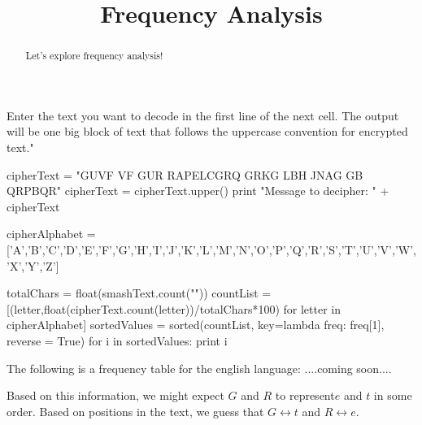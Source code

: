 \documentclass[handout]{ximera}
\title{Frequency Analysis}
\begin{document}
\begin{abstract}{Let's explore frequency analysis!}\end{abstract}


Enter the text you want to decode in the first line of the next cell.  The output will be one big block of text that follows the uppercase convention for encrypted text."

\begin{python}
cipherText = "GUVF VF GUR RAPELCGRQ GRKG LBH JNAG GB QRPBQR"
cipherText = cipherText.upper()
print "Message to decipher: " + cipherText

cipherAlphabet = ['A','B','C','D','E','F','G','H','I','J','K','L','M','N','O','P','Q','R','S','T','U','V','W','X','Y','Z']

totalChars = float(smashText.count(""))
countList = [(letter,float(cipherText.count(letter))/totalChars*100) for letter in cipherAlphabet]
sortedValues = sorted(countList, key=lambda freq: freq[1], reverse = True)
for i in sortedValues:
	print i
\end{python}

The following is a frequency table for the english language: ....coming soon....


Based on this information, we might expect $G$ and $R$ to represent$ e$ and $t$ in some order.  Based on positions in the text, we guess that $G \leftrightarrow t$ and $R \leftrightarrow e$.
\end{document}
